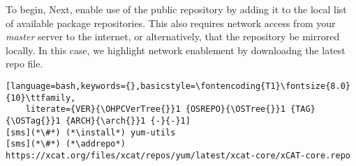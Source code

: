 To begin,
\else
Next, 
\fi
enable use of the public \xCAT{} repository by adding it to the local list
of available package repositories. This also requires network access from
your {\em master} server to the internet, or alternatively, that
the repository be mirrored locally. In this case, we highlight network
enablement by downloadng the latest \xCAT{} repo file.

\begin{lstlisting}[language=bash,keywords={},basicstyle=\fontencoding{T1}\fontsize{8.0}{10}\ttfamily,
	literate={VER}{\OHPCVerTree{}}1 {OSREPO}{\OSTree{}}1 {TAG}{\OSTag{}}1 {ARCH}{\arch{}}1 {-}{-}1]
[sms](*\#*) (*\install*) yum-utils
[sms](*\#*) (*\addrepo*) https://xcat.org/files/xcat/repos/yum/latest/xcat-core/xCAT-core.repo
\end{lstlisting}

